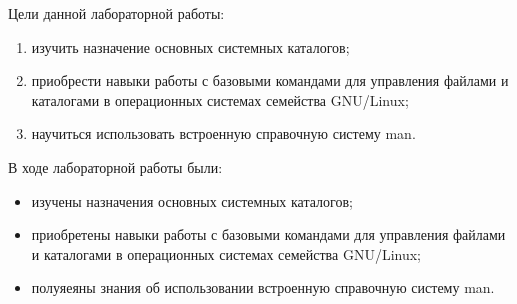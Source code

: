 
Цели данной лабораторной работы:
\begin{enumerate}
	\item изучить назначение основных системных каталогов;
	\item приобрести навыки работы с базовыми командами для управления файлами и каталогами в операционных системах семейства GNU/Linux;
	\item научиться использовать встроенную справочную систему man.
\end{enumerate}




\begin{figure}[!htbp]
	\centering
	\caption{}
\end{figure}
\FloatBarrier

%






В ходе лабораторной работы были: 
\begin{itemize}
	\item изучены назначения основных системных каталогов;
	\item приобретены навыки работы с базовыми командами для управления файлами и каталогами в операционных системах семейства GNU/Linux;
	\item полуяеяны знания об использовании встроенную справочную систему man.
\end{itemize}


